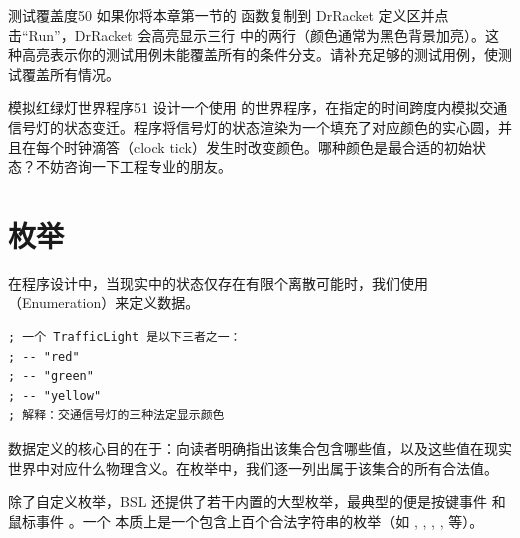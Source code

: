 \begin{exercise}{测试覆盖度}{50}
如果你将本章第一节的  函数复制到 DrRacket 定义区并点击“Run”，DrRacket 会高亮显示三行  中的两行（颜色通常为黑色背景加亮）。这种高亮表示你的测试用例未能覆盖所有的条件分支。请补充足够的测试用例，使测试覆盖所有情况。
\end{exercise}

\begin{exercise}{模拟红绿灯世界程序}{51}
设计一个使用  的世界程序，在指定的时间跨度内模拟交通信号灯的状态变迁。程序将信号灯的状态渲染为一个填充了对应颜色的实心圆，并且在每个时钟滴答（clock tick）发生时改变颜色。哪种颜色是最合适的初始状态？不妨咨询一下工程专业的朋友。
\end{exercise}

\section{枚举}
\label{sec:4.3_enumerations}

在程序设计中，当现实中的状态仅存在有限个离散可能时，我们使用（Enumeration）来定义数据。

\begin{lstlisting}[language=BSL]
; 一个 TrafficLight 是以下三者之一：
; -- "red"
; -- "green"
; -- "yellow"
; 解释：交通信号灯的三种法定显示颜色
\end{lstlisting}

数据定义的核心目的在于：向读者明确指出该集合包含哪些值，以及这些值在现实世界中对应什么物理含义。在枚举中，我们逐一列出属于该集合的所有合法值。

除了自定义枚举，BSL 还提供了若干内置的大型枚举，最典型的便是按键事件  和鼠标事件 。一个  本质上是一个包含上百个合法字符串的枚举（如 , , , ,  等）。


